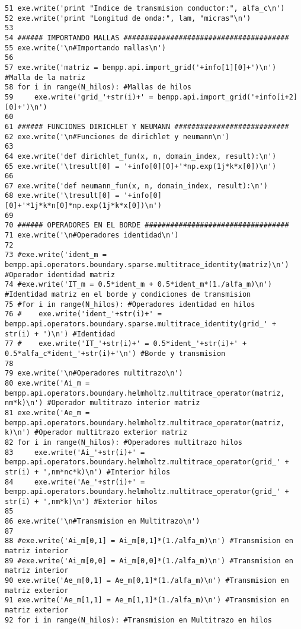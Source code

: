 \documentclass[12pt,letterpaper]{article}
\numberwithin{equation}{section}
\begin{document}
\begin{lstlisting}
51 exe.write('print "Indice de transmision conductor:", alfa_c\n')
52 exe.write('print "Longitud de onda:", lam, "micras"\n')
53 
54 ###### IMPORTANDO MALLAS #######################################
55 exe.write('\n#Importando mallas\n')
56 
57 exe.write('matriz = bempp.api.import_grid('+info[1][0]+')\n') #Malla de la matriz
58 for i in range(N_hilos): #Mallas de hilos
59     exe.write('grid_'+str(i)+' = bempp.api.import_grid('+info[i+2][0]+')\n')
60 
61 ###### FUNCIONES DIRICHLET Y NEUMANN ###########################
62 exe.write('\n#Funciones de dirichlet y neumann\n')
63 
64 exe.write('def dirichlet_fun(x, n, domain_index, result):\n')
65 exe.write('\tresult[0] = '+info[0][0]+'*np.exp(1j*k*x[0])\n')
66 
67 exe.write('def neumann_fun(x, n, domain_index, result):\n')
68 exe.write('\tresult[0] = '+info[0][0]+'*1j*k*n[0]*np.exp(1j*k*x[0])\n')
69 
70 ###### OPERADORES EN EL BORDE ##################################
71 exe.write('\n#Operadores identidad\n')
72 
73 #exe.write('ident_m = bempp.api.operators.boundary.sparse.multitrace_identity(matriz)\n') #Operador identidad matriz
74 #exe.write('IT_m = 0.5*ident_m + 0.5*ident_m*(1./alfa_m)\n') #Identidad matriz en el borde y condiciones de transmision
75 #for i in range(N_hilos): #Operadores identidad en hilos
76 #    exe.write('ident_'+str(i)+' = bempp.api.operators.boundary.sparse.multitrace_identity(grid_' + str(i) + ')\n') #Identidad
77 #    exe.write('IT_'+str(i)+' = 0.5*ident_'+str(i)+' + 0.5*alfa_c*ident_'+str(i)+'\n') #Borde y transmision
78 
79 exe.write('\n#Operadores multitrazo\n')
80 exe.write('Ai_m = bempp.api.operators.boundary.helmholtz.multitrace_operator(matriz, nm*k)\n') #Operador multitrazo interior matriz
81 exe.write('Ae_m = bempp.api.operators.boundary.helmholtz.multitrace_operator(matriz, k)\n') #Operador multitrazo exterior matriz
82 for i in range(N_hilos): #Operadores multitrazo hilos
83     exe.write('Ai_'+str(i)+' = bempp.api.operators.boundary.helmholtz.multitrace_operator(grid_' + str(i) + ',nm*nc*k)\n') #Interior hilos
84     exe.write('Ae_'+str(i)+' = bempp.api.operators.boundary.helmholtz.multitrace_operator(grid_' + str(i) + ',nm*k)\n') #Exterior hilos
85 
86 exe.write('\n#Transmision en Multitrazo\n')
87 
88 #exe.write('Ai_m[0,1] = Ai_m[0,1]*(1./alfa_m)\n') #Transmision en matriz interior
89 #exe.write('Ai_m[0,0] = Ai_m[0,0]*(1./alfa_m)\n') #Transmision en matriz interior
90 exe.write('Ae_m[0,1] = Ae_m[0,1]*(1./alfa_m)\n') #Transmision en matriz exterior
91 exe.write('Ae_m[1,1] = Ae_m[1,1]*(1./alfa_m)\n') #Transmision en matriz exterior
92 for i in range(N_hilos): #Transmision en Multitrazo en hilos

\end{lstlisting}
\end{document}
